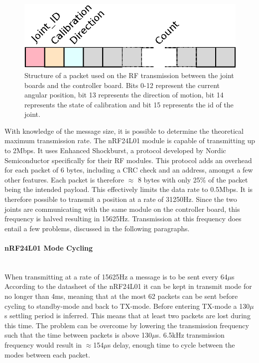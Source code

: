 \begin{figure}[h]
	\centering
	\includegraphics[width=.5\linewidth]{graphics/rf_packet}
	\caption[Structure of a packet used on the RF transmission between the joint boards and the controller board.]{Structure of a packet used on the RF transmission between the joint boards and the controller board. Bits 0-12 represent the current angular position, bit 13 represents the direction of motion, bit 14 represents the state of calibration and bit 15 represents the id of the joint.}
	\label{fig:rfpacket}
\end{figure}

With knowledge of the message size, it is possible to determine the theoretical maximum transmission rate.
The nRF24L01 module is capable of transmitting up to 2Mbps.
It uses Enhanced Shockburst, a protocol developed by Nordic Semiconductor specifically for their RF modules.
This protocol adds an overhead for each packet of 6 bytes, including a CRC check and an address, amongst a few other features.
Each packet is therefore $\approx$ 8 bytes with only 25\% of the packet being the intended payload.
This effectively limits the data rate to 0.5Mbps.
It is therefore possible to transmit a position at a rate of 31250Hz.
Since the two joints are communicating with the same module on the controller board, this frequency is halved resulting in 15625Hz.
Transmission at this frequency does entail a few problems, discussed in the following paragraphs.
\paragraph{nRF24L01 Mode Cycling}~\\ %
\label{par:nrf24l01_mode_cycling}
When transmitting at a rate of 15625Hz a message is to be sent every 64$\mu$s
According to the datasheet of the nRF24L01 it can be kept in transmit mode for no longer than 4ms, meaning that at the most 62 packets can be sent before cycling to standby-mode and back to TX-mode.
Before entering TX-mode a 130$\mu$s settling period is inferred.
This means that at least two packets are lost during this time.
The problem can be overcome by lowering the transmission frequency such that the time between packets is above 130$\mu$s.
6.5kHz transmission frequency would result in $\approx$154$\mu$s delay, enough time to cycle between the modes between each packet.
